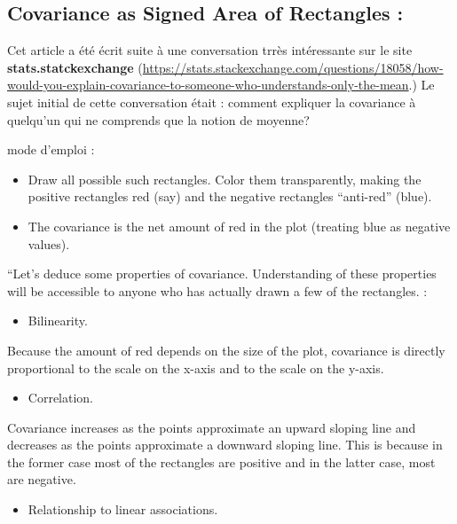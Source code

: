 \documentclass[
]{report}
\providecommand{\tightlist}{%
  \setlength{\itemsep}{0pt}\setlength{\parskip}{0pt}}
\begin{document}
\hypertarget{covariance-as-signed-area-of-rectangles}{%
\subsection{Covariance as Signed Area of Rectangles :}\label{covariance-as-signed-area-of-rectangles}}

Cet article \citep{chudzicki} a été écrit suite à une conversation trrès intéressante sur le site \textbf{stats.statckexchange} (\url{https://stats.stackexchange.com/questions/18058/how-would-you-explain-covariance-to-someone-who-understands-only-the-mean}.) Le sujet initial de cette conversation était : comment expliquer la covariance à quelqu'un qui ne comprends que la notion de moyenne?

mode d'emploi :

\begin{itemize}
\tightlist
\item
  Draw all possible such rectangles. Color them transparently, making the positive rectangles red (say) and the negative rectangles ``anti-red'' (blue).
\item
  The covariance is the net amount of red in the plot (treating blue as negative values).
\end{itemize}

``Let's deduce some properties of covariance. Understanding of these properties will be accessible to anyone who has actually drawn a few of the rectangles. :

\begin{itemize}
\tightlist
\item
  Bilinearity.
\end{itemize}

Because the amount of red depends on the size of the plot, covariance is directly proportional to the scale on the x-axis and to the scale on the y-axis.

\begin{itemize}
\tightlist
\item
  Correlation.
\end{itemize}

Covariance increases as the points approximate an upward sloping line and decreases as the points approximate a downward sloping line. This is because in the former case most of the rectangles are positive and in the latter case, most are negative.

\begin{itemize}
\tightlist
\item
  Relationship to linear associations.
\end{itemize}
\end{document}
